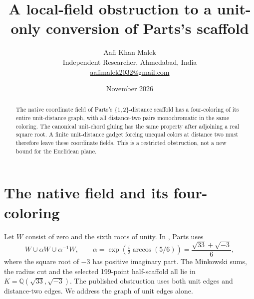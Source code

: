 \documentclass[11pt,letterpaper]{article}
\title{A local-field obstruction to a unit-only conversion of Parts's scaffold}
\author{Aafi Khan Malek\\\small Independent Researcher, Ahmedabad, India\\
\small\href{mailto:aafimalek2032@gmail.com}{aafimalek2032@gmail.com}}
\date{November 2026}
\begin{document}
\maketitle
\begin{abstract}
The native coordinate field of Parts's \(\{1,2\}\)-distance scaffold
has a four-coloring of its entire unit-distance graph, with all
distance-two pairs monochromatic in the same coloring. The canonical
unit-chord gluing has the same property after adjoining a real square
root. A finite unit-distance gadget forcing unequal colors at distance
two must therefore leave these coordinate fields. This is a restricted
obstruction, not a new bound for the Euclidean plane.
\end{abstract}

\section{The native field and its four-coloring}
Let \(W\) consist of zero and the sixth roots of unity. In
\cite[\S3]{parts-two}, Parts uses
\[
 W\cup\alpha W\cup\alpha^{-1}W,\qquad
 \alpha=\exp\left(\tfrac i2\arccos(5/6)\right)
       =\frac{\sqrt{33}+\sqrt{-3}}6 ,
\]
where the square root of \(-3\) has positive imaginary part. The
Minkowski sums, the radius cut and the selected 199-point
half-scaffold all lie in \(K=\mathbb Q(\sqrt{33},\sqrt{-3})\).
The published obstruction uses both unit edges and distance-two
edges. We address the graph of unit edges alone.
\end{document}
